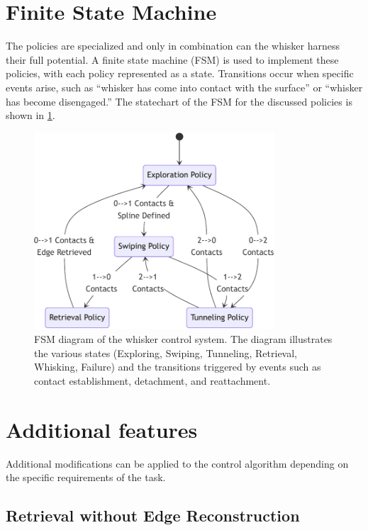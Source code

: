 \section{Finite State Machine}

The policies are specialized and only in combination can the whisker harness their full potential.
A finite state machine (FSM) is used to implement these policies, with each policy represented as a state.
Transitions occur when specific events arise, such as ``whisker has come into contact with the surface'' or ``whisker has become disengaged.''
The statechart of the FSM for the discussed policies is shown in \cref{fig:fsm}.

\begin{figure}[htb]
    \centering
    \includegraphics[width=0.8\textwidth]{figures/diagrams/fsm}
    \caption{FSM diagram of the whisker control system. The diagram illustrates the various states (Exploring, Swiping, Tunneling, Retrieval, Whisking, Failure) and the transitions triggered by events such as contact establishment, detachment, and reattachment.}
    \label{fig:fsm}
\end{figure}


\section{Additional features}

Additional modifications can be applied to the control algorithm depending on the specific requirements of the task.

\subsection{Retrieval without Edge Reconstruction}

